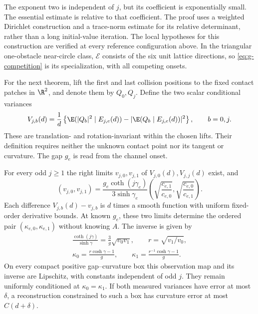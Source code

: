 The exponent two is independent of $j$, but its coefficient is
exponentially small. The essential estimate is relative to that
coefficient. The proof uses a weighted Dirichlet construction and a
trace-norm estimate for its relative determinant, rather than a
long initial-value iteration. The local hypotheses for this construction
are verified at every reference configuration above. In the triangular
one-obstacle near-circle class, $\mathcal E$ consists of the six unit
lattice directions, so \eqref{eq:g-competition} is its specialization, with all competing onsets.

For the next theorem, lift the first and last collision positions to
the fixed contact patches in $\R^2$, and denote them by $Q_0,Q_j$.
Define the two scalar conditional variances
\begin{equation}\label{eq:v3-observed-variance}
 V_{j,b}(d)=\frac1d\left\{
 \E(|Q_b|^2\mid E_{j,e}(d))-
       |\E(Q_b\mid E_{j,e}(d))|^2\right\},\qquad b=0,j.
\end{equation}
These are translation- and rotation-invariant within the chosen lifts.
Their definition requires neither the unknown contact point nor its
tangent or curvature. The gap $g_e$ is read from the channel onset.

\begin{theorem}
\label{thm:v3-tomography}
For every odd $j\ge1$ the right limits $v_{j,0},v_{j,1}$ of
$V_{j,0}(d),V_{j,j}(d)$ exist, and
\begin{equation}\label{eq:v3-variance-limits}
 (v_{j,0},v_{j,1})=
 \frac{g_e\coth(j\gamma_e)}{3\sinh\gamma_e}
 \left(\sqrt{\frac{c_{e,1}}{c_{e,0}}},
       \sqrt{\frac{c_{e,0}}{c_{e,1}}}\right).
\end{equation}
Each difference $V_{j,b}(d)-v_{j,b}$ is $d$ times a smooth function
with uniform fixed-order derivative bounds. At known $g_e$, these two
limits determine the ordered pair $(\kappa_{e,0},\kappa_{e,1})$ without
knowing $A$. The inverse is given by
\begin{equation}\label{eq:v3-inverse-map}
 \begin{gathered}
 \frac{\coth(j\gamma)}{\sinh\gamma}
        =\frac3g\sqrt{v_0v_1},\qquad
 r=\sqrt{v_1/v_0},\\
 \kappa_0=\frac{r\cosh\gamma-1}{g},\qquad
 \kappa_1=\frac{r^{-1}\cosh\gamma-1}{g}.
 \end{gathered}
\end{equation}
On every compact positive gap--curvature box this observation map and
its inverse are Lipschitz, with constants independent of odd $j$.
They remain uniformly conditioned at $\kappa_0=\kappa_1$.
If both measured variances have error at most $\delta$, a reconstruction
constrained to such a box has curvature error at most $C(d+\delta)$.
\end{theorem}

